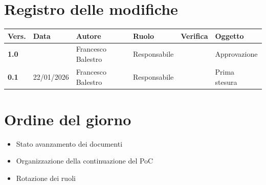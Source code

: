 \documentclass[a4paper,12pt]{article}
\begin{document}
    

    \newpage
    \section*{Registro delle modifiche}

    \begin{table}[h!]
        \begin{tabularx}{\textwidth}{|l|l|l|l|X|X|}
            \hline
            \textbf{Vers.} & \textbf{Data} & \textbf{Autore} & \textbf{Ruolo} & \textbf{Verifica} & \textbf{Oggetto} \\
            \hline
            \textbf{1.0} &  & Francesco Balestro & Responsabile & & Approvazione \\
            \hline
            \textbf{0.1} & 22/01/2026 & Francesco Balestro & Responsabile &  & Prima stesura \\
        \hline
        \end{tabularx}
    \end{table}

    \newpage
    \tableofcontents
    \newpage

    \section{Ordine del giorno} {
        \begin{itemize}
            \item Stato avanzamento dei documenti
            \item Organizzazione della continuazione del PoC
            \item Rotazione dei ruoli
        \end{itemize}
    }
\end{document}
